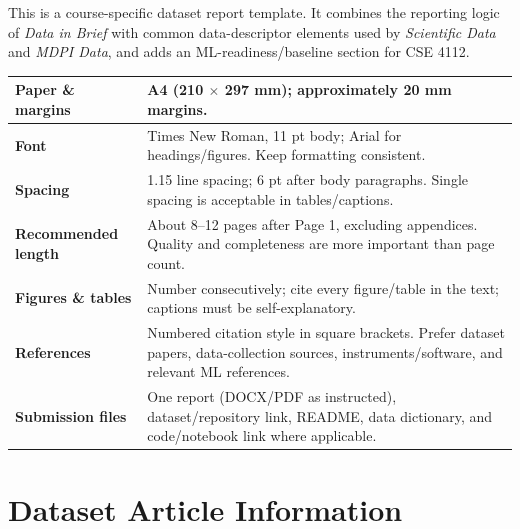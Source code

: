 \documentclass[11pt,a4paper]{article}
\newcommand{\thd}[1]{\textbf{\sffamily\small #1}}          %
\begin{document}
This is a course-specific dataset report template. It combines the reporting logic of
\emph{Data in Brief} with common data-descriptor elements used by \emph{Scientific Data} and
\emph{MDPI Data}, and adds an ML-readiness/baseline section for CSE 4112.

\begin{tabularx}{\textwidth}{|L{3.4cm}|Y|}
\hline
\thd{Paper \& margins}      & A4 (210 $\times$ 297 mm); approximately 20 mm margins. \\ \hline
\thd{Font}                  & Times New Roman, 11 pt body; Arial for headings/figures. Keep formatting consistent. \\ \hline
\thd{Spacing}               & 1.15 line spacing; 6 pt after body paragraphs. Single spacing is acceptable in tables/captions. \\ \hline
\thd{Recommended length}    & About 8--12 pages after Page 1, excluding appendices. Quality and completeness are more important than page count. \\ \hline
\thd{Figures \& tables}     & Number consecutively; cite every figure/table in the text; captions must be self-explanatory. \\ \hline
\thd{References}            & Numbered citation style in square brackets. Prefer dataset papers, data-collection sources, instruments/software, and relevant ML references. \\ \hline
\thd{Submission files}      & One report (DOCX/PDF as instructed), dataset/repository link, README, data dictionary, and code/notebook link where applicable. \\ \hline
\end{tabularx}

\section{Dataset Article Information}
\end{document}
